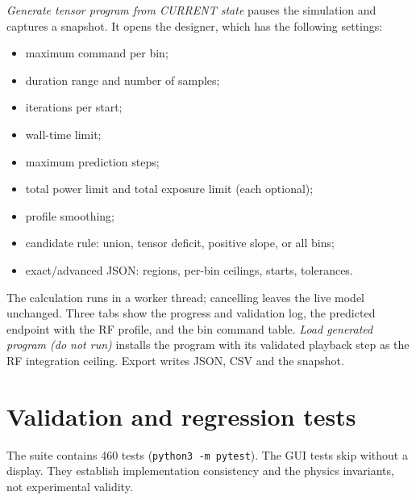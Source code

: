 \documentclass[11pt]{article}
\newcommand{\code}[1]{\texttt{#1}}
\begin{document}
\emph{Generate tensor program from CURRENT state} pauses the simulation and captures a snapshot.
It opens the designer, which has the following settings:
\begin{itemize}
\item maximum command per bin;
\item duration range and number of samples;
\item iterations per start;
\item wall-time limit;
\item maximum prediction steps;
\item total power limit and total exposure limit (each optional);
\item profile smoothing;
\item candidate rule: union, tensor deficit, positive slope, or all bins;
\item exact/advanced JSON: regions, per-bin ceilings, starts, tolerances.
\end{itemize}
The calculation runs in a worker thread; cancelling leaves the live model unchanged. Three tabs
show the progress and validation log, the predicted endpoint with the RF profile, and the bin
command table. \emph{Load generated program (do not run)} installs the program with its validated
playback step as the RF integration ceiling. Export writes JSON, CSV and the snapshot.

\section{Validation and regression tests}
\label{sec:tests}

The suite contains 460 tests (\code{python3 -m pytest}). The GUI tests skip without a display.
They establish implementation consistency and the physics invariants, not experimental validity.
\end{document}
